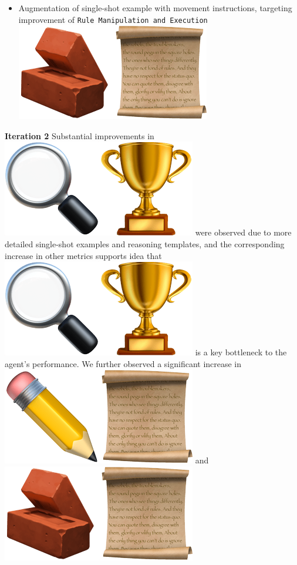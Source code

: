\begin{itemize}
	\item Augmentation of single-shot example with movement instructions,
		targeting improvement of \texttt{Rule Manipulation and Execution}
		\includegraphics[scale=0.07]{figs/emojis/emoji_7.png}
\end{itemize}

\textbf{Iteration 2} Substantial improvements in
\includegraphics[scale=0.07]{figs/emojis/emoji_1.png}
were observed due to more detailed single-shot examples and reasoning templates,
and the corresponding increase in other metrics supports idea that
\includegraphics[scale=0.07]{figs/emojis/emoji_1.png}
is a key bottleneck to the agent's performance. We further observed a significant
increase in
\includegraphics[scale=0.07]{figs/emojis/emoji_2.png}
and
\includegraphics[scale=0.07]{figs/emojis/emoji_7.png}
